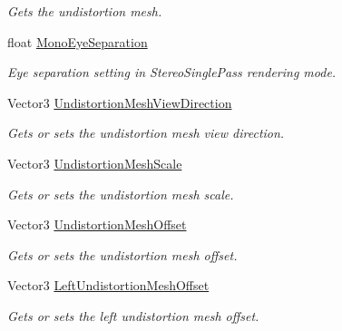 \begin{DoxyCompactItemize}
\begin{DoxyCompactList}\small\item\em Gets the undistortion mesh. \end{DoxyCompactList}\item 
float \mbox{\hyperlink{class_ximmerse_1_1_slide_in_s_d_k_1_1_reflection_len_profile_a5a44a2eb2970146e85fab72207704497}{Mono\+Eye\+Separation}}
\begin{DoxyCompactList}\small\item\em Eye separation setting in Stereo\+Single\+Pass rendering mode. \end{DoxyCompactList}\item 
Vector3 \mbox{\hyperlink{class_ximmerse_1_1_slide_in_s_d_k_1_1_reflection_len_profile_afceec0ec10fb9805d0aea4b0c6b81ca4}{Undistortion\+Mesh\+View\+Direction}}
\begin{DoxyCompactList}\small\item\em Gets or sets the undistortion mesh view direction. \end{DoxyCompactList}\item 
Vector3 \mbox{\hyperlink{class_ximmerse_1_1_slide_in_s_d_k_1_1_reflection_len_profile_a582185c2c8051bfe1e5eec0e59d1e962}{Undistortion\+Mesh\+Scale}}
\begin{DoxyCompactList}\small\item\em Gets or sets the undistortion mesh scale. \end{DoxyCompactList}\item 
Vector3 \mbox{\hyperlink{class_ximmerse_1_1_slide_in_s_d_k_1_1_reflection_len_profile_abe31d9a964dfa071ff745095f9c45227}{Undistortion\+Mesh\+Offset}}
\begin{DoxyCompactList}\small\item\em Gets or sets the undistortion mesh offset. \end{DoxyCompactList}\item 
Vector3 \mbox{\hyperlink{class_ximmerse_1_1_slide_in_s_d_k_1_1_reflection_len_profile_ab72f64824d36054e40a6996a3ce87e36}{Left\+Undistortion\+Mesh\+Offset}}
\begin{DoxyCompactList}\small\item\em Gets or sets the left undistortion mesh offset. \end{DoxyCompactList}\item 

\end{DoxyCompactItemize}
